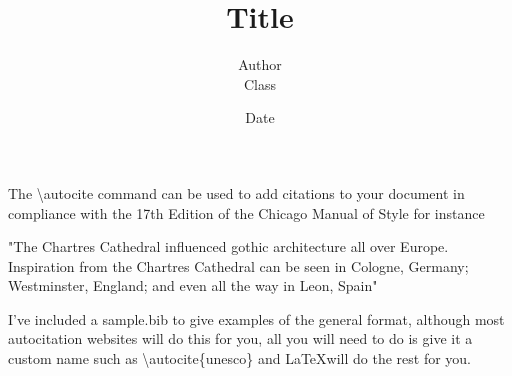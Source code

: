 \documentclass[letterpaper,12pt]{article}
\begin{document}
\title{\vspace{2in}\normalsize Title\vspace{2in}}
\author{\normalsize Author \\[-0.3in] \normalsize Class}
\date{\vspace{-0.25in}\normalsize Date}
\maketitle
{}
\newpage
{}
The \textbackslash autocite{} command can be used to add citations to your document in compliance with the 17th Edition of the Chicago Manual of Style for instance 

"The Chartres Cathedral influenced gothic architecture all over Europe.
Inspiration from the Chartres Cathedral can be seen in Cologne, Germany; Westminster, England; and even all the way in Leon, Spain\autocite{simson}"

I've included a sample.bib to give examples of the general format, although most autocitation websites will do this for you, all you will need to do is give it a custom name such as \textbackslash autocite\{unesco\} and \LaTeX will do the rest for you.

\newpage
\printbibliography
\end{document}
